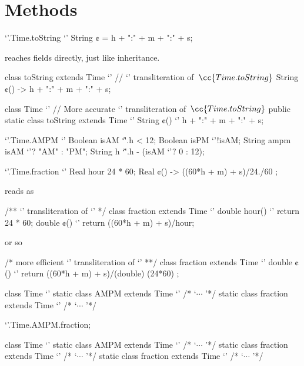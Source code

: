 \section{Methods}

\begin{reap}
  `'.Time.toString {`'
    String ¢ = h + ":" + m + ":" + s;
  }
\end{reap}
reaches fields directly, just like inheritance.
\begin{java}
  class toString extends Time {`' // `\Java' transliteration of~$\cc{Time.toString}$
    String ¢() -> h + ":" + m + ":" + s;
  }
\end{java}
\begin{java}
  class Time {`' // More accurate `\Java' transliteration of~$\cc{Time.toString}$
    public static class toString extends Time {`'
      String ¢() {`'
        h + ":" + m + ":" + s;
      }
    }
  }
\end{java}
\begin{reap}
  `'.Time.AMPM {`'
    Boolean isAM `\^'.h < 12;
    Boolean isPM `'!isAM;
    String ampm isAM `'? "AM" : "PM";
    String h `\^'.h - (isAM `'? 0 : 12);
  }
\end{reap}
\begin{reap}
  `'.Time.fraction {`'
    Real hour 24 * 60;
    Real ¢() -> ((60*h + m) + s)/24./60 ;
  }
\end{reap}
reads as
\begin{java}
  /** `\Java' transliteration of `'
  */
  class fraction extends Time {`'
    double hour() {`' return 24 * 60; }
    double ¢() {`' return ((60*h + m) + s)/hour; }
  }
\end{java}
or so
\begin{java}
  /* more efficient `\Java' transliteration of `'
  **/
  class fraction extends Time {`'
    double ¢() {`' return ((60*h + m) + s)/(double) (24*60) ; }
  }
\end{java}
\begin{java}
  class Time {`'
    static class AMPM extends Time {`' /* `$⋯$ '*/ }
    static class fraction extends Time {`' /* `$⋯$ '*/}
  }
\end{java}
\begin{reap}
  `'.Time.AMPM.fraction;
\end{reap}
\begin{java}
  class Time {`'
    static class AMPM extends Time {`'
      /* `$⋯$ '*/
      static class fraction extends Time {`' /* `$⋯$ '*/}
    }
    static class fraction extends Time {`' /* `$⋯$ '*/}
  }
\end{java}
